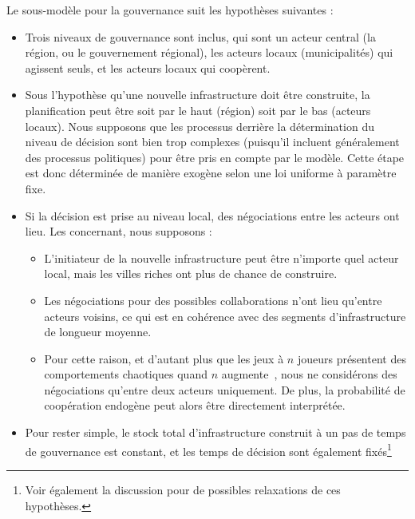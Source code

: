 {\begin{itemize}
\end{itemize}
}{
Le sous-modèle pour la gouvernance suit les hypothèses suivantes :
\begin{itemize}
	\item Trois niveaux de gouvernance sont inclus, qui sont un acteur central (la région, ou le gouvernement régional), les acteurs locaux (municipalités) qui agissent seuls, et les acteurs locaux qui coopèrent.%
	\item Sous l'hypothèse qu'une nouvelle infrastructure doit être construite, la planification peut être soit par le haut (région) soit par le bas (acteurs locaux). Nous supposons que les processus derrière la détermination du niveau de décision sont bien trop complexes (puisqu'il incluent généralement des processus politiques) pour être pris en compte par le modèle. Cette étape est donc déterminée de manière exogène selon une loi uniforme à paramètre fixe.%
	\item Si la décision est prise au niveau local, des négociations entre les acteurs ont lieu. Les concernant, nous supposons :
	\begin{itemize}
		\item L'initiateur de la nouvelle infrastructure peut être n'importe quel acteur local, mais les villes riches ont plus de chance de construire.
		\item Les négociations pour des possibles collaborations n'ont lieu qu'entre acteurs voisins, ce qui est en cohérence avec des segments d'infrastructure de longueur moyenne.
		\item Pour cette raison, et d'autant plus que les jeux à $n$ joueurs présentent des comportements chaotiques quand $n$ augmente~\cite{2016arXiv161208111S}, nous ne considérons des négociations qu'entre deux acteurs uniquement. De plus, la probabilité de coopération endogène peut alors être directement interprétée.
	\end{itemize}
	\item Pour rester simple, le stock total d'infrastructure construit à un pas de temps de gouvernance est constant, et les temps de décision sont également fixés\footnote{Voir également la discussion pour de possibles relaxations de ces hypothèses.}
\end{itemize}
}





